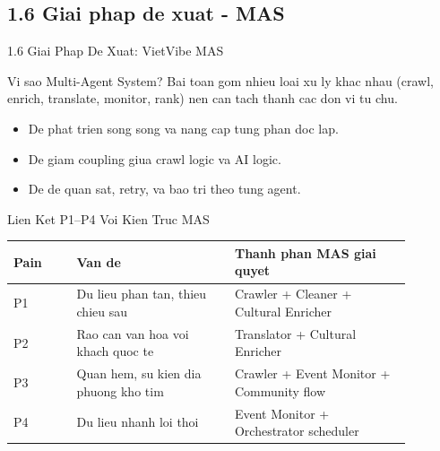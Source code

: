 \subsection{1.6 Giai phap de xuat - MAS}

\begin{frame}[t]{1.6 Giai Phap De Xuat: VietVibe MAS}
\begin{block}{Vi sao Multi-Agent System?}
Bai toan gom nhieu loai xu ly khac nhau (crawl, enrich, translate, monitor, rank) nen can tach thanh cac don vi tu chu.
\end{block}

\begin{itemize}
    \item De phat trien song song va nang cap tung phan doc lap.
    \item De giam coupling giua crawl logic va AI logic.
    \item De de quan sat, retry, va bao tri theo tung agent.
\end{itemize}
\end{frame}

\begin{frame}[t]{Lien Ket P1--P4 Voi Kien Truc MAS}
\footnotesize
\begin{table}[]
\centering
\begin{tabular}{p{0.14\linewidth} p{0.35\linewidth} p{0.39\linewidth}}
\toprule
\textbf{Pain} & \textbf{Van de} & \textbf{Thanh phan MAS giai quyet} \\
\midrule
P1 & Du lieu phan tan, thieu chieu sau & Crawler + Cleaner + Cultural Enricher \\
P2 & Rao can van hoa voi khach quoc te & Translator + Cultural Enricher \\
P3 & Quan hem, su kien dia phuong kho tim & Crawler + Event Monitor + Community flow \\
P4 & Du lieu nhanh loi thoi & Event Monitor + Orchestrator scheduler \\
\bottomrule
\end{tabular}
\end{table}
\end{frame}

